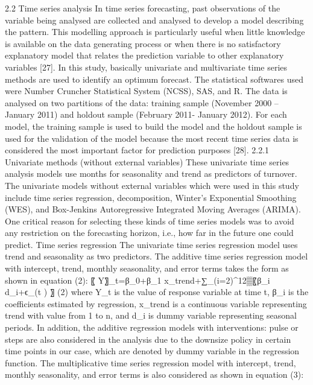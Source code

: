 2.2    Time series analysis
In time series forecasting, past observations of the variable being analysed are collected and analysed to develop a model describing the pattern. This modelling approach is particularly useful when little knowledge is available on the data generating process or when there is no satisfactory explanatory model that relates the prediction variable to other explanatory variables [27]. In this study, basically univariate and multivariate time series methods are used to identify an optimum forecast. The statistical softwares used were Number Cruncher Statistical System (NCSS), SAS, and R. The data is analysed on two partitions of the data: training sample (November 2000 – January 2011) and holdout sample (February 2011- January 2012). For each model, the training sample is used to build the model and the holdout sample is used for the validation of the model because the most recent time series data is considered the most important factor for prediction purposes [28]. 
2.2.1    Univariate methods (without external variables)
These univariate time series analysis models use months for seasonality and trend as predictors of turnover. The univariate models without external variables which were used in this study include time series regression, decomposition, Winter’s Exponential Smoothing (WES), and Box-Jenkins Autoregressive Integrated Moving Averages (ARIMA). One critical reason for selecting these kinds of time series models was to avoid any restriction on the forecasting horizon, i.e., how far in the future one could predict.
	Time series regression 
The univariate time series regression model uses trend and seasonality as two predictors. The additive time series regression model with intercept, trend, monthly seasonality, and error terms takes the form as shown in equation (2):
〖                                           Y〗_t=β_0+β_1 x_trend+∑_(i=2)^12▒〖β_i d_i+ϵ_(t )                〗                                  (2)
where Y_t is the value of response variable at time t,  β_i is the coefficients estimated by regression, x_trend is a continuous variable representing trend with value from 1 to n, and d_i is dummy variable representing seasonal periods. In addition, the additive regression models with interventions: pulse or steps are also considered in the analysis due to the downsize policy in certain time points in our case, which are denoted by dummy variable in the regression function. The multiplicative time series regression model with intercept, trend, monthly seasonality, and error terms is also considered as shown in equation (3):
